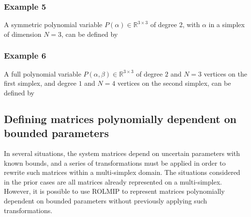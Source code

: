 \documentclass[english,11pt]{article}
\theoremstyle{break} \theorembodyfont{\small\rm}
\begin{document}


\subsubsection*{Example 5}
A symmetric polynomial variable $P(\alpha) \in \mathbb{R}^{3 \times 3}$ of degree
$2$, with $\alpha$ in a simplex of dimension $N=3$, can be defined by

\vspace{0.5cm}%
\begin{minipage}{8.5cm}
\end{minipage}
\vspace{0.2cm}


\subsubsection*{Example 6}
A full polynomial variable $P(\alpha,\beta) \in \mathbb{R}^{3 \times 3}$ of degree
$2$ and $N=3$ vertices on the first simplex, and degree $1$ and $N=4$ vertices on
the second simplex, can be defined by

\vspace{0.5cm}%
\begin{minipage}{12.5cm}
\end{minipage}
\vspace{0.2cm}

\subsection{Defining matrices polynomially dependent on bounded parameters}

In several situations, the system matrices depend on uncertain parameters with known bounds,
and a series of transformations must be applied in order to rewrite such matrices within a multi-simplex
domain. The situations considered in the prior cases are all matrices already represented on
a multi-simplex. However, it is possible to use ROLMIP to represent matrices polynomially dependent 
on bounded parameters without previously applying such transformations. 
\end{document}
